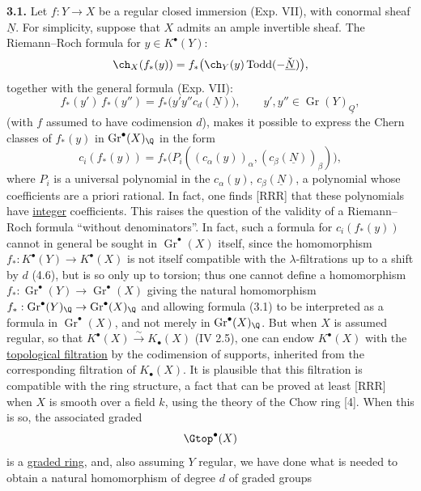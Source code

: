 \textbf{3.1.} Let $f:Y\to X$ be a regular closed immersion (Exp. VII), with conormal sheaf $\underline N$. For simplicity, suppose that $X$ admits an ample invertible sheaf. The Riemann--Roch formula for $y\in K^\bullet(Y)$:
\[
 \ch_X(f_*(y))=f_*\bigl(\ch_Y(y)\operatorname{Todd}(-\check{\underline N})\bigr),
\]
together with the general formula (Exp. VII):
\[
 f_*(y')\,f_*(y'')=f_*\bigl(y'y''c_d(\underline N)\bigr),\qquad y',y''\in \operatorname{Gr}(Y)_{\underline Q},
\]
(with $f$ assumed to have codimension $d$), makes it possible to express the Chern classes of $f_*(y)$ in $\operatorname{Gr}^\bullet(X)_\Q$ in the form
%
\begin{equation}\tag{3.1}
 c_i(f_*(y))=f_*\bigl(P_i((c_\alpha(y))_\alpha,(c_\beta(\underline N))_\beta)\bigr),
\end{equation}
where $P_i$ is a universal polynomial in the $c_\alpha(y)$, $c_\beta(\underline N)$, a polynomial whose coefficients are a priori rational. In fact, one finds [RRR] that these polynomials have \uline{integer} coefficients. This raises the question of the validity of a Riemann--Roch formula ``without denominators''. In fact, such a formula for $c_i(f_*(y))$ cannot in general be sought in $\operatorname{Gr}^\bullet(X)$ itself, since the homomorphism $f_*:K^\bullet(Y)\to K^\bullet(X)$ is not itself compatible with the $\lambda$-filtrations up to a shift by $d$ (4.6), but is so only up to torsion; thus one cannot define a homomorphism $f_*:\operatorname{Gr}^\bullet(Y)\longrightarrow \operatorname{Gr}^\bullet(X)$ giving the natural homomorphism $f_*:\operatorname{Gr}^\bullet(Y)_\Q\to\operatorname{Gr}^\bullet(X)_\Q$ and allowing formula (3.1) to be interpreted as a formula in $\operatorname{Gr}^\bullet(X)$, and not merely in $\operatorname{Gr}^\bullet(X)_\Q$. But when $X$ is assumed regular, so that $K^\bullet(X)\xrightarrow{\sim} K_\bullet(X)$ (IV 2.5), one can endow $K^\bullet(X)$ with the \uline{topological filtration} by the codimension of supports, inherited from the corresponding filtration of $K_\bullet(X)$. It is plausible that this filtration is compatible with the ring structure, a fact that can be proved at least [RRR] when $X$ is smooth over a field $k$, using the theory of the Chow ring [4]. When this is so, the associated graded
\[
 \Gtop^\bullet(X)
\]
is a \uline{graded ring}, and, also assuming $Y$ regular, we have done what is needed to obtain a natural homomorphism of degree $d$ of graded groups
